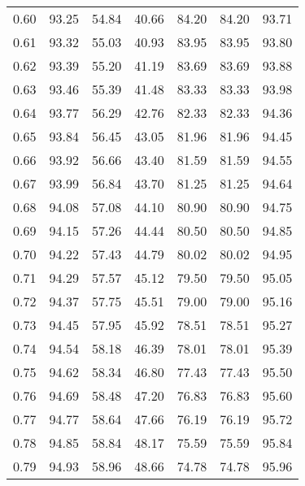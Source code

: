 \begin{tabular}{|c|c|c|c|c|c|c|}
      0.60 &     93.25 &     54.84 &      40.66 &   84.20 &      84.20 &         93.71 \\
      0.61 &     93.32 &     55.03 &      40.93 &   83.95 &      83.95 &         93.80 \\
      0.62 &     93.39 &     55.20 &      41.19 &   83.69 &      83.69 &         93.88 \\
      0.63 &     93.46 &     55.39 &      41.48 &   83.33 &      83.33 &         93.98 \\
      0.64 &     93.77 &     56.29 &      42.76 &   82.33 &      82.33 &         94.36 \\
      0.65 &     93.84 &     56.45 &      43.05 &   81.96 &      81.96 &         94.45 \\
      0.66 &     93.92 &     56.66 &      43.40 &   81.59 &      81.59 &         94.55 \\
      0.67 &     93.99 &     56.84 &      43.70 &   81.25 &      81.25 &         94.64 \\
      0.68 &     94.08 &     57.08 &      44.10 &   80.90 &      80.90 &         94.75 \\
      0.69 &     94.15 &     57.26 &      44.44 &   80.50 &      80.50 &         94.85 \\
      0.70 &     94.22 &     57.43 &      44.79 &   80.02 &      80.02 &         94.95 \\
      0.71 &     94.29 &     57.57 &      45.12 &   79.50 &      79.50 &         95.05 \\
      0.72 &     94.37 &     57.75 &      45.51 &   79.00 &      79.00 &         95.16 \\
      0.73 &     94.45 &     57.95 &      45.92 &   78.51 &      78.51 &         95.27 \\
      0.74 &     94.54 &     58.18 &      46.39 &   78.01 &      78.01 &         95.39 \\
      0.75 &     94.62 &     58.34 &      46.80 &   77.43 &      77.43 &         95.50 \\
      0.76 &     94.69 &     58.48 &      47.20 &   76.83 &      76.83 &         95.60 \\
      0.77 &     94.77 &     58.64 &      47.66 &   76.19 &      76.19 &         95.72 \\
      0.78 &     94.85 &     58.84 &      48.17 &   75.59 &      75.59 &         95.84 \\
      0.79 &     94.93 &     58.96 &      48.66 &   74.78 &      74.78 &         95.96 \\

\end{tabular}
